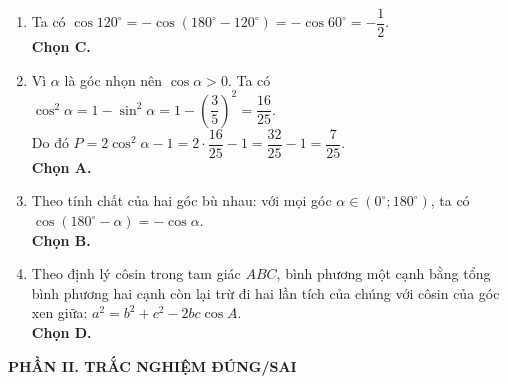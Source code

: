 \documentclass[12pt,a4paper]{article}
\begin{document}
\begin{enumerate}
\item Ta có $\cos 120^\circ = -\cos(180^\circ - 120^\circ) = -\cos 60^\circ = -\dfrac{1}{2}$.\\
\textbf{Chọn C.}

\item Vì $\alpha$ là góc nhọn nên $\cos \alpha > 0$. Ta có $\cos^2 \alpha = 1 - \sin^2 \alpha = 1 - \left(\dfrac{3}{5}\right)^2 = \dfrac{16}{25}$.\\
Do đó $P = 2\cos^2 \alpha - 1 = 2 \cdot \dfrac{16}{25} - 1 = \dfrac{32}{25} - 1 = \dfrac{7}{25}$.\\
\textbf{Chọn A.}

\item Theo tính chất của hai góc bù nhau: với mọi góc $\alpha \in (0^\circ; 180^\circ)$, ta có $\cos(180^\circ - \alpha) = -\cos \alpha$.\\
\textbf{Chọn B.}

\item Theo định lý côsin trong tam giác $ABC$, bình phương một cạnh bằng tổng bình phương hai cạnh còn lại trừ đi hai lần tích của chúng với côsin của góc xen giữa: $a^2 = b^2 + c^2 - 2bc\cos A$.\\
\textbf{Chọn D.}
\end{enumerate}

\textbf{PHẦN II. TRẮC NGHIỆM ĐÚNG/SAI}
\end{document}

